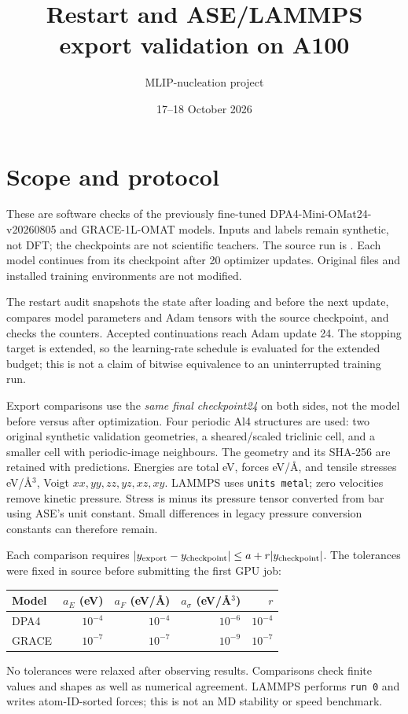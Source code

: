 \documentclass[10pt,a4paper]{article}
\title{Restart and ASE/LAMMPS export validation on A100}
\author{MLIP-nucleation project}
\date{17--18 October 2026}
\begin{document}
\maketitle

\section{Scope and protocol}
These are software checks of the previously fine-tuned DPA4-Mini-OMat24-v20260805
and GRACE-1L-OMAT models. Inputs and labels remain synthetic, not DFT; the
checkpoints are not scientific teachers. The source run is
.
Each model continues from its checkpoint after 20 optimizer updates.
Original files and installed training environments are not modified.

The restart audit snapshots the state after loading and before the next update,
compares model parameters and Adam tensors with the source checkpoint, and checks
the counters. Accepted continuations reach Adam update 24. The stopping target
is extended, so the learning-rate schedule is evaluated for the extended budget;
this is not a claim of bitwise equivalence to an uninterrupted training run.

Export comparisons use the \emph{same final checkpoint24} on both sides, not
the model before versus after optimization. Four periodic Al4 structures are
used: two original synthetic validation geometries, a sheared/scaled triclinic
cell, and a smaller cell with periodic-image neighbours. The geometry and its
SHA-256 are retained with predictions. Energies are total eV, forces eV/\AA,
and tensile stresses eV/\AA$^3$, Voigt $xx,yy,zz,yz,xz,xy$.
LAMMPS uses \texttt{units metal}; zero velocities remove kinetic pressure.
Stress is minus its pressure tensor converted from bar using ASE's unit constant.
Small differences in legacy pressure conversion constants can therefore remain.

Each comparison requires
$|y_{\rm export}-y_{\rm checkpoint}|\leq a+r|y_{\rm checkpoint}|$.
The tolerances were fixed in source before submitting the first GPU job:
\begin{center}
\begin{tabular}{@{}lrrrr@{}}
\toprule
Model & $a_E$ (eV) & $a_F$ (eV/\AA) & $a_\sigma$ (eV/\AA$^3$) & $r$ \\
\midrule
DPA4 & $10^{-4}$ & $10^{-4}$ & $10^{-6}$ & $10^{-4}$ \\
GRACE & $10^{-7}$ & $10^{-7}$ & $10^{-9}$ & $10^{-7}$ \\
\bottomrule
\end{tabular}
\end{center}
No tolerances were relaxed after observing results. Comparisons check finite
values and shapes as well as numerical agreement. LAMMPS performs \texttt{run 0}
and writes atom-ID-sorted forces; this is not an MD stability or speed benchmark.
\end{document}
